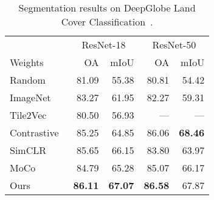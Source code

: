 \documentclass[journal]{IEEEtran}
\begin{document}
\begin{table}
  \center
  \caption{Segmentation results on DeepGlobe Land Cover Classification~\cite{deepglobe}.
  }\label{table:deepglobe}
  \begin{tabular}{lrrrr}
    \toprule
    &\multicolumn{2}{c}{ResNet-18}&\multicolumn{2}{c}{ResNet-50}\\
    Weights&OA&mIoU&OA&mIoU\\
    \midrule
    Random                        & 81.09 & 55.38 & 80.81 & 54.42 \\
    ImageNet                      & 83.27 & 61.95 & 82.27 & 59.31 \\
    Tile2Vec~\cite{tile2vec}      & 80.50 & 56.93 & --- & ---\\
    Contrastive~\cite{simclr}     & 85.25 & 64.85 & 86.06 & \textbf{68.46} \\
    SimCLR~\cite{simclr}          & 85.65 & 66.15 & 83.80 & 63.97 \\
    MoCo~\cite{he_momentum_2020}  & 84.79 & 65.28 & 85.07 & 66.17 \\
    Ours                          & \textbf{86.11} & \textbf{67.07} & \textbf{86.58} & 67.87 \\
    \bottomrule
  \end{tabular}
  \vspace{6pt}
\end{table}
\end{document}
